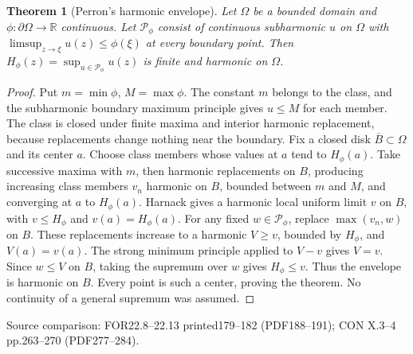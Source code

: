 \documentclass[11pt,a4paper,openany]{book}
\newtheorem{theorem}{Theorem}[chapter]
\theoremstyle{definition}
\theoremstyle{remark}\newtheorem{remark}[theorem]{Remark}
\newcommand{\R}{\mathbb R}\newcommand{\C}{\mathbb C}
\newcommand{\family}[1]{}
\newcommand{\source}[1]{\par\begingroup\small\sffamily\color{black!65}Source comparison: #1\par\endgroup}
\begin{document}
\begin{theorem}[Perron's harmonic envelope]\family{D12.14.03}\label{d12:14-03}
Let $\Omega$ be a bounded domain and $\phi:\partial\Omega\to\R$ continuous. Let $\mathcal P_\phi$ consist of continuous subharmonic $u$ on $\Omega$ with $\limsup_{z\to\xi}u(z)\le\phi(\xi)$ at every boundary point. Then
$H_\phi(z)=\sup_{u\in\mathcal P_\phi}u(z)$ is finite and harmonic on $\Omega$.
\end{theorem}
\begin{proof}
Put $m=\min\phi$, $M=\max\phi$. The constant $m$ belongs to the class, and the subharmonic boundary maximum principle gives $u\le M$ for each member. The class is closed under finite maxima and interior harmonic replacement, because replacements change nothing near the boundary.
Fix a closed disk $\overline B\subset\Omega$ and its center $a$. Choose class members whose values at $a$ tend to $H_\phi(a)$. Take successive maxima with $m$, then harmonic replacements on $B$, producing increasing class members $v_n$ harmonic on $B$, bounded between $m$ and $M$, and converging at $a$ to $H_\phi(a)$. Harnack gives a harmonic local uniform limit $v$ on $B$, with $v\le H_\phi$ and $v(a)=H_\phi(a)$. For any fixed $w\in\mathcal P_\phi$, replace $\max(v_n,w)$ on $B$. These replacements increase to a harmonic $V\ge v$, bounded by $H_\phi$, and $V(a)=v(a)$. The strong minimum principle applied to $V-v$ gives $V=v$. Since $w\le V$ on $B$, taking the supremum over $w$ gives $H_\phi\le v$. Thus the envelope is harmonic on $B$. Every point is such a center, proving the theorem. No continuity of a general supremum was assumed.
\end{proof}
\source{FOR22.8--22.13 printed179--182 (PDF188--191); CON X.3--4 pp.263--270 (PDF277--284).}
\end{document}
